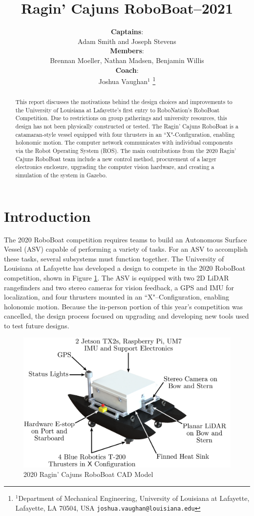 \documentclass[letterpaper, 12 pt, conference]{ieeeconf}
\title{\LARGE \bf Ragin' Cajuns RoboBoat--2021}
\author{\textbf{Captains}:\\Adam Smith and Joseph Stevens \\
\textbf{Members}:\\Brennan Moeller, Nathan Madsen, Benjamin Willis\\
\textbf{Coach}:\\Joshua Vaughan$^{1}$%
\thanks{$^{1}$Department of Mechanical Engineering,
        University of Louisiana at Lafayette, Lafayette, LA 70504, USA
        {\tt\small joshua.vaughan@louisiana.edu}}%
}
\begin{document}
\maketitle
\thispagestyle{fancyplain}
\begin{abstract}
This report discusses the motivations behind the design choices and improvements to the University of Louisiana at Lafayette's first entry to RoboNation's RoboBoat Competition. Due to restrictions on group gatherings and university resources, this design has not been physically constructed or tested.  The Ragin' Cajuns RoboBoat is a catamaran-style vessel equipped with four thrusters in an ``X"-Configuration, enabling holonomic motion. The computer network communicates with individual components via the Robot Operating System (ROS). The main contributions from the 2020 Ragin' Cajuns RoboBoat team include a new control method, procurement of a larger electronics enclosure, upgrading the computer vision hardware, and creating a simulation of the system in Gazebo.
\end{abstract}

\section{Introduction}
The 2020 RoboBoat competition requires teams to build an Autonomous Surface Vessel (ASV) capable of performing a variety of tasks. For an ASV to accomplish these tasks, several subsystems must function together. The University of Louisiana at Lafayette has developed a design to compete in the 2020 RoboBoat competition, shown in Figure \ref{fig:RoboBoat}. The ASV is equipped with two 2D LiDAR rangefinders and two stereo cameras for vision feedback, a GPS and IMU for localization, and four thrusters mounted in an ``X"--Configuration, enabling holonomic motion. Because the in-person portion of this year's competition was cancelled, the design process focused on upgrading and developing new tools used to test future designs.
%
\begin{figure}[tb]
\centering
\includegraphics[width=\columnwidth]{Figures/Catamaran_Final_Render_3.pdf}
\caption{2020 Ragin' Cajuns RoboBoat CAD Model}
\label{fig:RoboBoat}
\end{figure}
%
\end{document}
